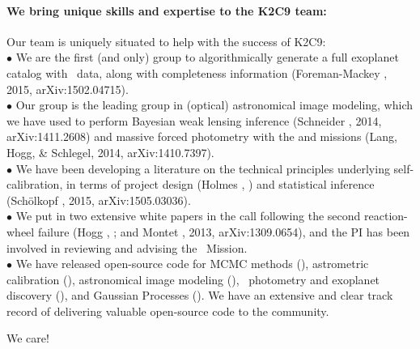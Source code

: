 \documentclass[12pt,preprint]{aastex}
\begin{document}
\paragraph{We bring unique skills and expertise to the K2C9 team:}

Our team is uniquely situated to help with the success of K2C9:\\
$\bullet$ We are the first (and only) group to algorithmically
generate a full exoplanet catalog with \ktwo\ data, along with
completeness information (Foreman-Mackey \etal, 2015,
arXiv:1502.04715).\\
$\bullet$ Our group is the leading group in (optical) astronomical
image modeling, which we have used to perform Bayesian weak lensing
inference (Schneider \etal, 2014, arXiv:1411.2608) and
massive forced photometry with the  and 
missions (Lang, Hogg, \& Schlegel, 2014,
arXiv:1410.7397).\\
$\bullet$ We have been developing a literature on the technical
principles underlying self-calibration, in terms of project design
(Holmes \etal, \opcit) and statistical inference
(Sch\"olkopf \etal, 2015, arXiv:1505.03036).\\
$\bullet$ We put in two extensive white papers in the call following
the second reaction-wheel failure (Hogg \etal, \opcit; and
Montet \etal, 2013, arXiv:1309.0654), and the PI has
been involved in reviewing and advising the \kepler\ Mission.\\
$\bullet$ We have released open-source code for MCMC methods
(), astrometric calibration (),
astronomical image modeling (), \ktwo\ photometry
and exoplanet discovery (), and Gaussian Processes
().  We have an extensive and clear track record of
delivering valuable open-source code to the community.

We care!
\end{document}
